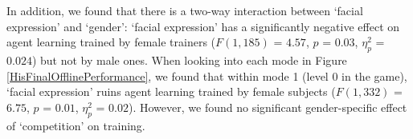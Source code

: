\documentclass[10pt,journal,compsoc]{IEEEtran}
\begin{document}


In addition, we found that there is a two-way interaction between `facial expression' and `gender':  
`facial expression' has a significantly negative effect on agent learning trained by female trainers ($F(1,185)$ = $4.57$, $p$ = $0.03$, $\eta_{p}^{2}$ = $0.024$) but not by male ones. When looking into each mode in Figure \ref{HisFinalOfflinePerformance}, we found that within mode 1 (level 0 in the game), %
`facial expression' ruins agent learning trained by female subjects ($F(1,332)$ = $6.75$, $p$ = $0.01$, $\eta_{p}^{2}$ = $0.02$). However, we found no significant gender-specific effect of `competition' on training.
\end{document}
